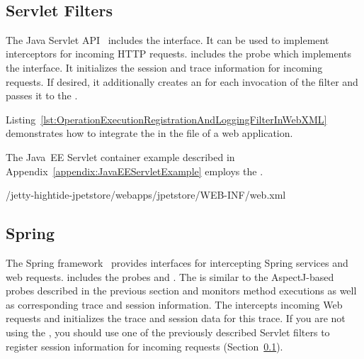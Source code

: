 \


\subsection{Servlet Filters}\label{sec:traceAnalysis:instr:servlet}

The Java Servlet API~\cite{JavaServletTechnology-WebSite} includes the %
 interface. It can be used to implement %
interceptors for incoming HTTP requests. %
\Kieker{} includes the probe %
 which implements the %
 interface. %
It initializes the session and trace information for incoming requests. %
If desired, it additionally creates an  for each %
invocation of the filter and passes it to the .


Listing~\ref{lst:OperationExecutionRegistrationAndLoggingFilterInWebXML} %
demonstrates how to integrate the  %
in the  file of a web application.

The Java~EE Servlet container example described in Appendix~\ref{appendix:JavaEEServletExample} employs the %
.

\pagebreak

\setXMLListing
%
{\JavaEEServletExampleDir/jetty-hightide-jpetstore/webapps/jpetstore/WEB-INF/web.xml}


\subsection{Spring}\label{sec:traceAnalysis:instr:spring}

The Spring framework~\cite{Spring-WebSite} provides interfaces for intercepting %
Spring services and web requests. %
\Kieker{} includes the probes %
 and
. %
The  is similar to the %
AspectJ-based probes described in the previous section and monitors method %
executions as well as corresponding trace and session information. %
The  intercepts %
incoming Web requests and initializes the trace and session data for this %
trace. If you are not using the , %
you should use one of the previously described Servlet filters to register %
session information for incoming requests %
(Section~\ref{sec:traceAnalysis:instr:servlet}).

